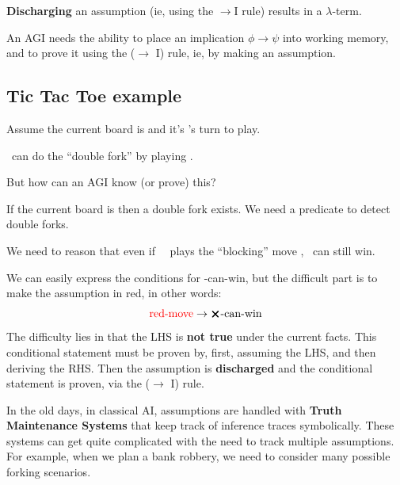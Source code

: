\textbf{Discharging} an assumption (ie, using the $\rightarrow$I rule) results in a $\lambda$-term.

An AGI needs the ability to place an implication $\phi \rightarrow \psi$ into working memory, and to prove it using the ($\rightarrow$ I) rule, ie, by making an assumption.

\subsection{Tic Tac Toe example}

Assume the current board is
 and it's \bX's turn to play.

\bX \ can do the ``double fork'' by playing
.

But how can an AGI know (or prove) this?

If the current board is 
  then a double fork exists.  We need a predicate to detect double forks.

We need to reason that even if \ \bO \ plays the ``blocking'' move
  , \bX \ can still win.

We can easily express the conditions for \bX-can-win, but the difficult part is to make the assumption in {\color{red}red}, in other words:
\begin{equation}
\mbox{{\color{red}red-move}} \rightarrow \mbox{$\pmb{\bm{\times}}$-can-win}
\end{equation}
The difficulty lies in that the LHS is \textbf{not true} under the current facts.  This conditional statement must be proven by, first, assuming the LHS, and then deriving the RHS.  Then the assumption is \textbf{discharged} and the conditional statement is proven, via the ($\rightarrow$ I) rule.

In the old days, in classical AI, assumptions are handled with \textbf{Truth Maintenance Systems} that keep track of inference traces symbolically.  These systems can get quite complicated with the need to track multiple assumptions.  For example, when we plan a bank robbery, we need to consider many possible forking scenarios.  





